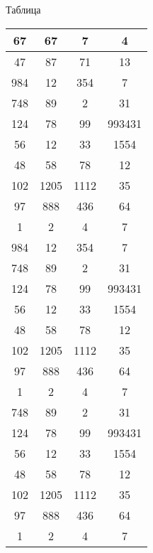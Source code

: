 \documentclass[rusmathsym, eqnumwithinsec,amspack, hyperref]{bomgost}
\begin{document}
\begin{gostappendix}{Таблица}
\begin{table}[H]
\centering
\begin{tabular}{|c|c|c|c|}
\hline 
67 & 67 & 7 & 4 \\ 
\hline 
47 & 87 & 71 & 13 \\ 
\hline 
984 & 12 & 354 & 7 \\ 
\hline 
748 & 89 & 2 & 31 \\ 
\hline 
124 & 78 & 99 & 993431 \\ 
\hline 
56 & 12 & 33 & 1554 \\ 
\hline 
48 & 58 & 78 & 12 \\ 
\hline 
102 & 1205 & 1112 & 35 \\ 
\hline 
97 & 888 & 436 & 64 \\ 
\hline 
1 & 2 & 4 & 7 \\ 
984 & 12 & 354 & 7 \\ 
\hline 
748 & 89 & 2 & 31 \\ 
\hline 
124 & 78 & 99 & 993431 \\ 
\hline 
56 & 12 & 33 & 1554 \\ 
\hline 
48 & 58 & 78 & 12 \\ 
\hline 
102 & 1205 & 1112 & 35 \\ 
\hline 
97 & 888 & 436 & 64 \\ 
\hline 
1 & 2 & 4 & 7 \\ 
748 & 89 & 2 & 31 \\ 
\hline 
124 & 78 & 99 & 993431 \\ 
\hline 
56 & 12 & 33 & 1554 \\ 
\hline 
48 & 58 & 78 & 12 \\ 
\hline 
102 & 1205 & 1112 & 35 \\ 
\hline 
97 & 888 & 436 & 64 \\ 
\hline 
1 & 2 & 4 & 7 \\ 
\hline 
\end{tabular} 
\end{table}
\end{gostappendix}
\end{document}
